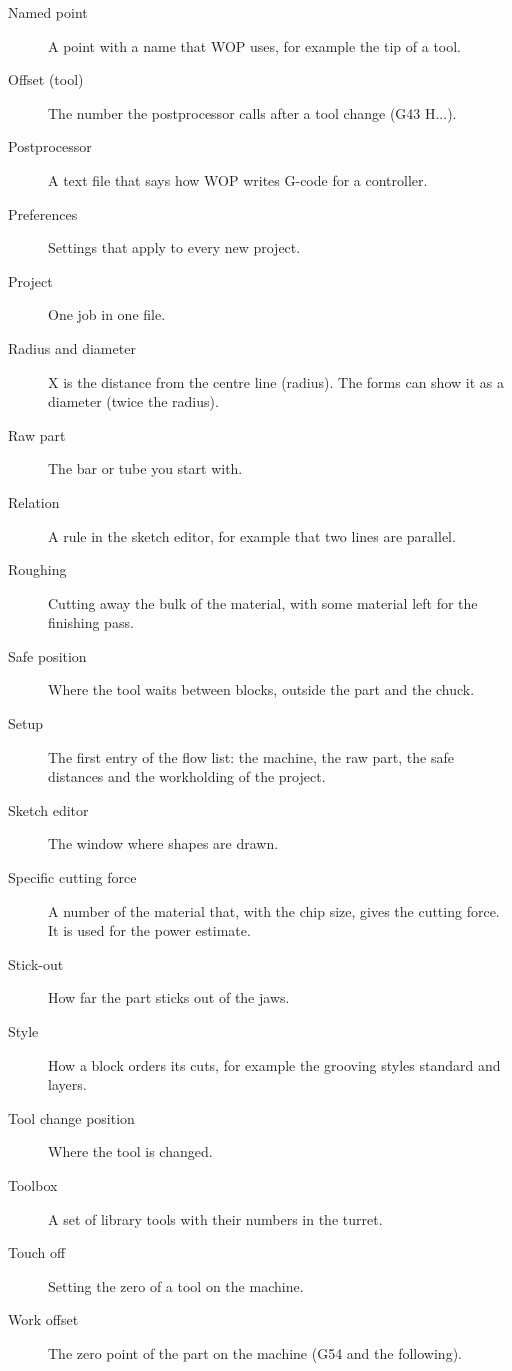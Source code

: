 \begin{description}
\item[Named point] A point with a name that WOP uses, for example the tip of a tool.
\item[Offset (tool)] The number the postprocessor calls after a tool change (G43 H...).
\item[Postprocessor] A text file that says how WOP writes G-code for a controller.
\item[Preferences] Settings that apply to every new project.
\item[Project] One job in one file.
\item[Radius and diameter] X is the distance from the centre line (radius). The forms can show it as a diameter (twice the radius).
\item[Raw part] The bar or tube you start with.
\item[Relation] A rule in the sketch editor, for example that two lines are parallel.
\item[Roughing] Cutting away the bulk of the material, with some material left for the finishing pass.
\item[Safe position] Where the tool waits between blocks, outside the part and the chuck.
\item[Setup] The first entry of the flow list: the machine, the raw part, the safe distances and the workholding of the project.
\item[Sketch editor] The window where shapes are drawn.
\item[Specific cutting force] A number of the material that, with the chip size, gives the cutting force. It is used for the power estimate.
\item[Stick-out] How far the part sticks out of the jaws.
\item[Style] How a block orders its cuts, for example the grooving styles standard and layers.
\item[Tool change position] Where the tool is changed.
\item[Toolbox] A set of library tools with their numbers in the turret.
\item[Touch off] Setting the zero of a tool on the machine.
\item[Work offset] The zero point of the part on the machine (G54 and the following).
\end{description}
